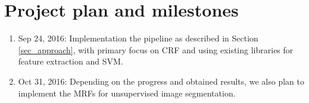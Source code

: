 \documentclass[a4paper]{article}
\begin{document}
\section{Project plan and milestones}

\begin{enumerate}
  \item Sep 24, 2016: Implementation the pipeline as described in Section 
\ref{sec_approach}, with primary focus on CRF and using existing libraries for 
feature extraction and SVM.

  \item Oct 31, 2016: Depending on the progress and obtained results, we also 
plan to implement the MRFs for unsupervised image segmentation.

\end{enumerate}



\end{document}
